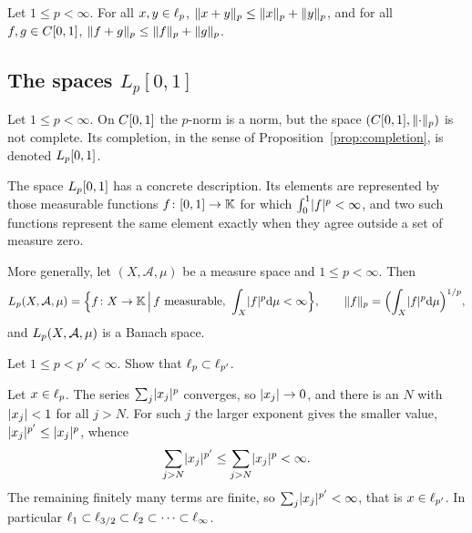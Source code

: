 \begin{theorem}\label{thm:minkowski-inf}
Let $1 \le p < \infty$. For all $x, y \in \lp{p}$,
$\norm{x+y}_p \le \norm{x}_p + \norm{y}_p$, and for all
$f, g \in \Cont{0,1}$, $\norm{f+g}_p \le \norm{f}_p + \norm{g}_p$.
\end{theorem}

\subsection{The spaces \texorpdfstring{$L_p[0,1]$}{Lp[0,1]}}

\begin{definition}[{$\Lp{p}[0,1]$}]\label{def:lp}
Let $1 \le p < \infty$. On $\Cont{0,1}$ the $p$-norm is a norm, but the space
$(\Cont{0,1}, \norm{\cdot}_p)$ is not complete. Its completion, in the sense
of Proposition~\ref{prop:completion}, is denoted $\Lp{p}[0,1]$.
\end{definition}

\begin{remark}\label{rem:lp-repr}
The space $\Lp{p}[0,1]$ has a concrete description. Its elements are
represented by those measurable functions $f \colon [0,1] \to \K$ for which
$\int_0^1 \abs{f}^p < \infty$, and two such functions represent the same
element exactly when they agree outside a set of measure zero.
\end{remark}

\begin{remark}\label{rem:lp-measure}
More generally, let $(X, \mathcal{A}, \mu)$ be a measure space and
$1 \le p < \infty$. Then
\[
  \Lp{p}(X, \mathcal{A}, \mu) = \set[\Big]{f \colon X \to \K \,\Big|\,
    f \text{ measurable}, \ \int_X \abs{f}^p \dd\mu < \infty},
  \qquad
  \norm{f}_p = \Bigl(\int_X \abs{f}^p \dd\mu\Bigr)^{1/p},
\]
and $\Lp{p}(X, \mathcal{A}, \mu)$ is a Banach space.
\end{remark}

\begin{exercise}\label{exc:lp-inclusion}
Let $1 \le p < p' < \infty$. Show that $\lp{p} \subset \lp{p'}$.
\end{exercise}

\begin{solution}
Let $x \in \lp{p}$. The series $\sum_j \abs{x_j}^p$ converges, so
$\abs{x_j} \to 0$, and there is an $N$ with $\abs{x_j} < 1$ for all $j > N$.
For such $j$ the larger exponent gives the smaller value,
$\abs{x_j}^{p'} \le \abs{x_j}^{p}$, whence
\[
  \sum_{j > N} \abs{x_j}^{p'} \le \sum_{j > N} \abs{x_j}^{p} < \infty .
\]
The remaining finitely many terms are finite, so
$\sum_j \abs{x_j}^{p'} < \infty$, that is $x \in \lp{p'}$. In particular
$\lp{1} \subset \lp{3/2} \subset \lp{2} \subset \dots \subset \lp{\infty}$.
\end{solution}

